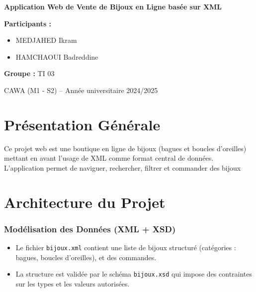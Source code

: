 \documentclass[14pt]{extarticle}
\begin{document}
\begin{titlepage}
    \vspace{4cm}

  \begin{center}
 
   \begin{spacing}{1.5}
    {\Large \bfseries Application Web de Vente de Bijoux en Ligne basée sur XML}
\end{spacing}


        \vspace{1.5cm}
  \end{center}
     
\vspace{5cm}
        \textbf{Participants :}  
        \begin{itemize}[label=-]
            \item MEDJAHED Ikram
            \item HAMCHAOUI Badreddine
        \end{itemize}

        \textbf{Groupe :} TI 03 \\
\begin{center}
    \vspace{1.5cm}
        { CAWA (M1 - S2) – Année universitaire 2024/2025} \\
\end{center}
    \vfill
\end{titlepage}

\section*{Présentation Générale}
Ce projet web est une boutique en ligne de bijoux (bagues et boucles d’oreilles) mettant en avant l’usage de XML comme format central de données. L'application permet de naviguer, rechercher, filtrer et commander des bijoux

\section*{Architecture du Projet}
\subsubsection*{Modélisation des Données (XML + XSD)}
\begin{itemize}[label=-]
    \item Le fichier \texttt{bijoux.xml} contient une liste de bijoux structuré (catégories : bagues, boucles d’oreilles), et des commandes.
    \item La structure est validée par le schéma \texttt{bijoux.xsd} qui impose des contraintes sur les types et les valeurs autorisées.
\end{itemize}
\end{document}
